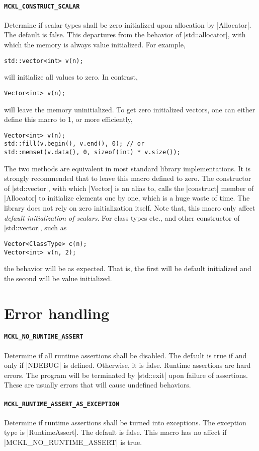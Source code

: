 \paragraph{\texttt{MCKL\_CONSTRUCT\_SCALAR}} Determine if scalar types shall be
zero initialized upon allocation by |Allocator|. The default is false. This
departures from the behavior of |std::allocator|, with which the memory is
always value initialized. For example,
\begin{verbatim}
std::vector<int> v(n);
\end{verbatim}
will initialize all values to zero. In contrast,
\begin{verbatim}
Vector<int> v(n);
\end{verbatim}
will leave the memory uninitialized. To get zero initialized vectors, one can
either define this macro to 1, or more efficiently,
\begin{verbatim}
Vector<int> v(n);
std::fill(v.begin(), v.end(), 0); // or
std::memset(v.data(), 0, sizeof(int) * v.size());
\end{verbatim}
The two methods are equivalent in most standard library implementations. It is
strongly recommended that to leave this macro defined to zero. The constructor
of |std::vector|, with which |Vector| is an alias to, calls the |construct|
member of |Allocator| to initialize elements one by one, which is a huge waste
of time. The library does not rely on zero initialization itself. Note that,
this macro only affect \emph{default initialization of scalars}. For class
types etc., and other constructor of |std::vector|, such as
\begin{verbatim}
Vector<ClassType> c(n);
Vector<int> v(n, 2);
\end{verbatim}
the behavior will be as expected. That is, the first will be default
initialized and the second will be value initialized.

\section{Error handling}
\label{sec:Error handling}

\paragraph{\texttt{MCKL\_NO\_RUNTIME\_ASSERT}} Determine if all runtime
assertions shall be disabled. The default is true if and only if |NDEBUG| is
defined. Otherwise, it is false. Runtime assertions are hard errors. The
program will be terminated by |std::exit| upon failure of assertions. These are
usually errors that will cause undefined behaviors.

\paragraph{\texttt{MCKL\_RUNTIME\_ASSERT\_AS\_EXCEPTION}} Determine if runtime
assertions shall be turned into exceptions. The exception type is
|RuntimeAssert|. The default is false. This macro has no affect if
|MCKL_NO_RUNTIME_ASSERT| is true.
